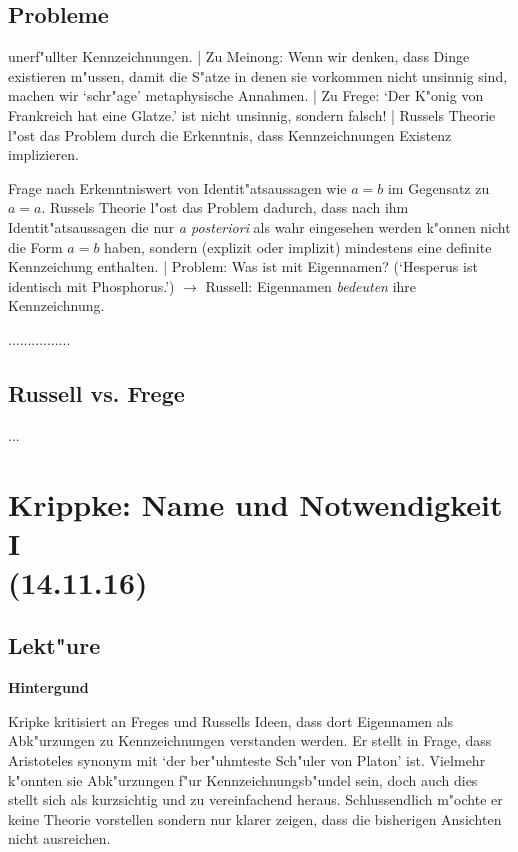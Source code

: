 \documentclass[emulatestandardclasses]{scrartcl}
\begin{document}
\subsection{Probleme}

\begin{description}[leftmargin=!,labelwidth=\widthof{\bfseries Probl. des Bezugs}]
    \item[Probl. des Bezugs] unerf"ullter Kennzeichnungen. | Zu Meinong: Wenn wir denken, dass Dinge existieren m"ussen, damit die S"atze in denen sie vorkommen nicht unsinnig sind, machen wir `schr"age' metaphysische Annahmen. | Zu Frege: `Der K"onig von Frankreich hat eine Glatze.' ist nicht unsinnig, sondern falsch! | Russels Theorie l"ost das Problem durch die Erkenntnis, dass Kennzeichnungen Existenz implizieren.
    \item[Freges R"atsel] Frage nach Erkenntniswert von Identit"atsaussagen wie $a = b$ im Gegensatz zu $a = a$. Russels Theorie l"ost das Problem dadurch, dass nach ihm Identit"atsaussagen die nur \emph{a posteriori} als wahr eingesehen werden k"onnen nicht die Form $a = b$ haben, sondern (explizit oder implizit) mindestens eine definite Kennzeichung enthalten. | Problem: Was ist mit Eigennamen? (`Hesperus ist identisch mit Phosphorus.') $\rightarrow$ Russell: Eigennamen \emph{bedeuten} ihre Kennzeichnung.
    \item[...] ................
\end{description}

\subsection{Russell vs. Frege}

...


\section{Krippke: Name und Notwendigkeit I\\(14.11.16)}

\subsection{Lekt"ure}

\noindent\textbf{Hintergund}

Kripke kritisiert an Freges und Russells Ideen, dass dort Eigennamen als Abk"urzungen zu Kennzeichnungen verstanden werden. Er stellt in Frage, dass Aristoteles synonym mit `der ber"uhmteste Sch"uler von Platon' ist. Vielmehr k"onnten sie Abk"urzungen f"ur Kennzeichnungsb"undel sein, doch auch dies stellt sich als kurzsichtig und zu vereinfachend heraus. Schlussendlich m"ochte er keine Theorie vorstellen sondern nur klarer zeigen, dass die bisherigen Ansichten nicht ausreichen.\\
\end{document}
